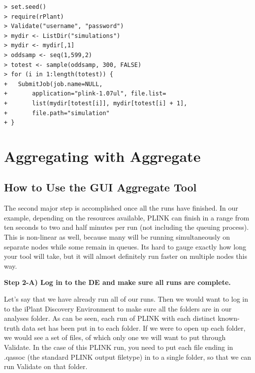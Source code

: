 \documentclass[twoside,a4paper]{refart}
\begin{document}
\begin{center}
\begin{lstlisting}[frame=single]
> set.seed()
> require(rPlant) 
> Validate("username", "password")
> mydir <- ListDir("simulations")
> mydir <- mydir[,1]
> oddsamp <- seq(1,599,2)
> totest <- sample(oddsamp, 300, FALSE)
> for (i in 1:length(totest)) {
+ 	SubmitJob(job.name=NULL, 
+		application="plink-1.07ul", file.list=
+		list(mydir[totest[i]], mydir[totest[i] + 1],
+		file.path="simulation"
+ }
\end{lstlisting}
\end{center}


\section{Aggregating with Aggregate}

\subsection{How to Use the GUI Aggregate Tool}
The second major step is accomplished once all the runs have finished. In our example, depending on the resources available, PLINK can finish in a range from ten seconds to two and half minutes per run (not including the queuing process). This is non-linear as well, because many will be running simultaneously on separate nodes while some remain in queues. Its hard to gauge exactly how long your tool will take, but it will almost definitely run faster on multiple nodes this way.

\textbf{Step 2-A) Log in to the DE and make sure all runs are complete.}

Let's say that we have already run all of our runs. Then we would want to log in to the iPlant Discovery Environment to make sure all the folders are in our analyses folder. As can be seen, each run of PLINK with each distinct known-truth data set has been put in to each folder. If we were to open up each folder, we would see a set of files, of which only one we will want to put through Validate. In the case of this PLINK run, you need to put each file ending in .qassoc (the standard PLINK output filetype) in to a single folder, so that we can run Validate on that folder. 
\end{document}
